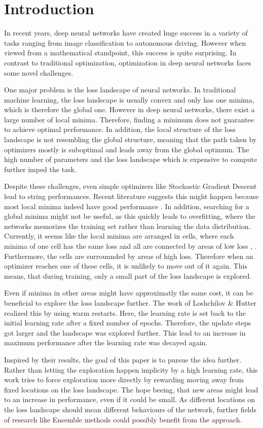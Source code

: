 \chapter{Introduction}\label{cha:Introduction}
In recent years, deep neural networks have created huge success in a variety of
tasks ranging from image classification to autonomous driving. However when
viewed from a mathematical standpoint, this success is quite surprising. In
contrast to traditional optimization, optimization in deep neural networks faces
some novel challenges.

One major problem is the loss landscape of neural networks. In traditional
machine learning, the loss landscape is usually convex and only has one minima,
which is therefore the global one. However in deep neural networks, there exist
a large number of local minima. Therefore, finding a minimum does not guarantee
to achieve optimal performance. In addition, the local structure of the loss
landscape is not resembling the global structure, meaning that the path taken by
optimizers mostly is suboptimal and leads away from the global optimum. The high
number of parameters and the loss landscape which is expensive to compute
further imped the task.

Despite these challenges, even simple optimizers like Stochastic Gradient
Descent lead to string performances. Recent literature suggests this might
happen because most local minima indeed have good performance
\cite{choromanska2015loss}. In addition, searching for a global minima might not
be useful, as this quickly leads to overfitting, where the networks memorizes
the training set rather than learning the data distribution. Currently, it seems
like the local minima are arranged in cells, where each minima of one cell has
the same loss and all are connected by areas of low loss \cite{he2020piecewise},
\cite{draxler2018essentially}. Furthermore, the cells are surrounnded by areas
of high loss. Therefore when an optimizer reaches one of these cells, it is
unlikely to move out of it again. This means, that during training, only a small
part of the loss landscape is explored.

Even if minima in other areas might have approximatly the same cost, it can be
beneficial to explore the loss landscape further. The work of Loshchilov \&
Hutter \cite{loshchilov2016sgdr} realized this by using warm restarts. Here, the
learning rate is set back to the initial learning rate after a fixed number of
epochs. Therefore, the update steps got larger and the landscape was explored
further. This lead to an increase in maximum performance after the learning rate
was decayed again.

Inspired by their results, the goal of this paper is to pursue the idea further.
Rather than letting the exploration happen implicity by a high learning rate,
this work tries to force exploration more directly by rewarding moving away from
fixed locations on the loss landscape. The hope beeing, that new areas might
lead to an increase in performance, even if it could be small. As different
locations on the loss landscape should mean different behaviours of the network,
further fields of research like Ensemble methods could possibly benefit from the
approach.

